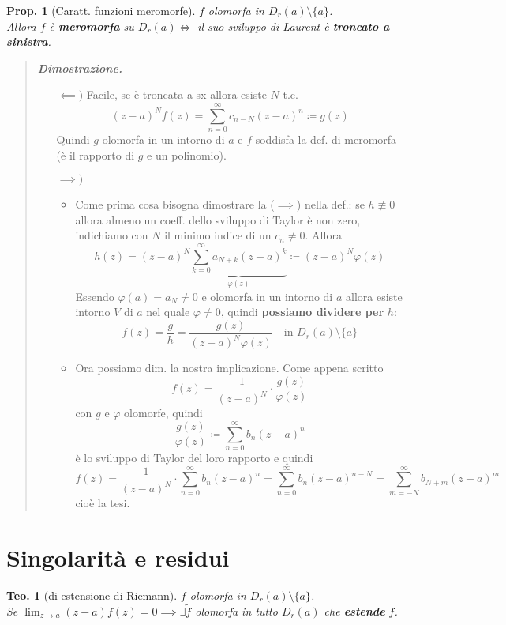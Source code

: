 \documentclass[a4paper,10pt]{article}
\theoremstyle{indentdefinition}
\theoremstyle{indenttheorem}
\newtheorem{thm}{Teo.}
\newtheorem{prop}{Prop.}
\theoremstyle{myremark}
\theoremstyle{indentgeneral}
\newenvironment{dimo}{\begin{quote}\textit{\textbf{Dimostrazione.}}}{\end{quote}} %
\begin{document}
\begin{prop}[Caratt. funzioni meromorfe]
    $f$ olomorfa in $D_r(a)\setminus\{a\}$. \\
    Allora $f$ è \textbf{meromorfa} su $D_r(a)\iff$ il suo sviluppo di Laurent è \textbf{troncato a sinistra}.
\end{prop}
\begin{dimo}
    \begin{itemize}
        \item[$\impliedby)$] Facile, se è troncata a sx allora esiste $N$ t.c.
        $$(z-a)^Nf(z)=\sum_{n=0}^{\infty}c_{n-N}(z-a)^n\coloneqq g(z)$$
        Quindi $g$ olomorfa in un intorno di $a$ e $f$ soddisfa la def. di meromorfa (è il rapporto di $g$ e un polinomio).
        \item[$\implies)$] \begin{itemize}
            \item Come prima cosa bisogna dimostrare la ($\implies$) nella def.: se $h\not\equiv 0$ allora almeno un coeff. dello sviluppo di Taylor è non zero, indichiamo con $N$ il  minimo indice di un $c_n\ne0$. Allora
        $$h(z)=(z-a)^N\underbrace{\sum_{k=0}^\infty a_{N+k}(z-a)^k}_{\varphi(z)}\coloneqq(z-a)^N\varphi(z)$$
        Essendo $\varphi(a)=a_N\ne0$ e olomorfa in un intorno di $a$ allora esiste intorno $V$ di $a$ nel quale $\varphi\ne 0$, quindi \textbf{possiamo dividere per} $h$:
        $$f(z)=\frac{g}{h}=\frac{g(z)}{(z-a)^N\varphi(z)}  \quad \text{in } D_r(a)\setminus\{a\}$$
        \item Ora possiamo dim. la nostra implicazione. Come appena scritto
         $$f(z)=\frac{1}{(z-a)^N}\cdot\frac{g(z)}{\varphi(z)}$$
         con $g$ e $\varphi$ olomorfe, quindi
         $$\frac{g(z)}{\varphi(z)}\coloneqq\sum_{n=0}^\infty b_n(z-a)^n$$
         è lo sviluppo di Taylor del loro rapporto e quindi 
         $$f(z)=\frac{1}{(z-a)^N}\cdot\sum_{n=0}^\infty b_n(z-a)^n=\sum_{n=0}^\infty b_n(z-a)^{n-N}=\sum_{m=-N}^\infty b_{N+m}(z-a)^m$$
         cioè la tesi.
        \end{itemize}
    \end{itemize}
\end{dimo}

\section{Singolarità e residui}
\begin{thm}[di estensione di Riemann]
     $f$ olomorfa in $D_r(a)\setminus\{a\}$. \\
     Se $\lim_{z\to a}(z-a)f(z)=0 \implies \exists\tilde{f}$ olomorfa in tutto $D_r(a)$ che \textbf{estende} $f$.
\end{thm}
\end{document}
